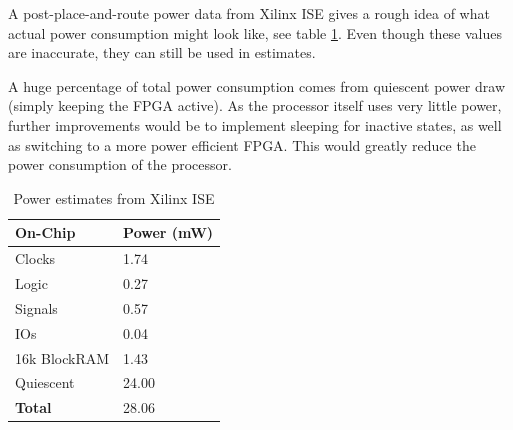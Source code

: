 A post-place-and-route power data from Xilinx ISE gives a rough idea of what actual power consumption might look like, see table \ref{tab:power_consumption}.
Even though these values are inaccurate, they can still be used in estimates.

A huge percentage of total power consumption comes from quiescent power draw (simply keeping the FPGA active).
As the processor itself uses very little power, further improvements would be to implement sleeping for inactive states, as well as switching to a more power efficient FPGA.
This would greatly reduce the power consumption of the processor.

\begin{table}[h]
    \centering
    \begin{tabular}{|l|l|}
        \hline
        \textbf{On-Chip} & \textbf{Power (mW)} \\ \hline
        Clocks           & 1.74                \\ \hline
        Logic            & 0.27                \\ \hline
        Signals          & 0.57                \\ \hline
        IOs              & 0.04                \\ \hline
        16k BlockRAM     & 1.43                \\ \hline
        Quiescent        & 24.00               \\ \hline
        \textbf{Total}   & 28.06               \\ \hline
    \end{tabular}
    \caption{Power estimates from Xilinx ISE}
    \label{tab:power_consumption}
\end{table}
